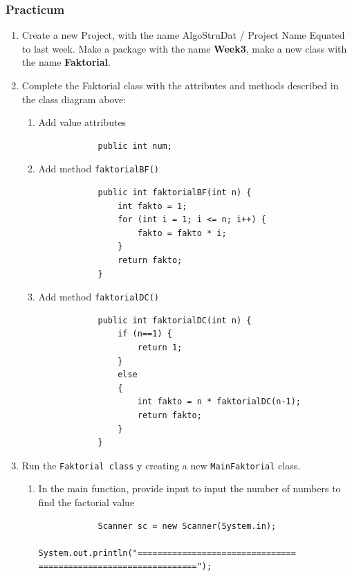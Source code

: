 \documentclass[12pt,titlepage]{article}
\begin{document}
\subsubsection{Practicum}

\begin{enumerate}
    \item Create a new Project, with the name AlgoStruDat / Project Name Equated to last week. Make a package with the name \textbf{Week3}, make a new class with the name \textbf{Faktorial}.
    \item Complete the Faktorial class with the attributes and methods described in the class diagram above:
    \begin{enumerate}
        \item Add value attributes
        \begin{verbatim}
            public int num;
        \end{verbatim}
        \item Add method \texttt{faktorialBF()}
        \begin{verbatim}
            public int faktorialBF(int n) {
                int fakto = 1;
                for (int i = 1; i <= n; i++) {
                    fakto = fakto * i;
                }
                return fakto;
            }
        \end{verbatim}
        \item Add method \texttt{faktorialDC()}
        \begin{verbatim}
            public int faktorialDC(int n) {
                if (n==1) {
                    return 1;
                }
                else
                {
                    int fakto = n * faktorialDC(n-1);
                    return fakto;
                }
            }
        \end{verbatim}
    \end{enumerate}
    \item Run the \texttt{Faktorial class} y creating a new \texttt{MainFaktorial} class.
    \begin{enumerate}
        \item In the main function, provide input to input the number of numbers to find the factorial value
        \begin{verbatim}
            Scanner sc = new Scanner(System.in);
            System.out.println("================================ ================================");

\end{verbatim}
\end{enumerate}
\end{enumerate}
\end{document}
